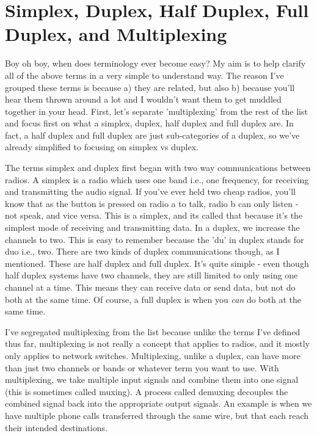 \documentclass{article}
\begin{document}
\section{Simplex, Duplex, Half Duplex, Full Duplex, and Multiplexing}

Boy oh boy, when does terminology ever become easy? My aim is to help clarify all of the above terms in a
very simple to understand way. The reason I've grouped these terms is because a) they are related, but also
b) because you'll hear them thrown around a lot and I wouldn't want them to get muddled together in your head.
First, let's separate 'multiplexing' from the rest of the list and focus first on what a simplex, duplex, half
duplex and full duplex are. In fact, a half duplex and full duplex are just sub-categories of a duplex, so
we've already simplified to focusing on simplex vs duplex.

The terms simplex and duplex first began with two way communications between radios. A simplex is a radio
which uses one band i.e., one frequency, for receiving and transmitting the audio signal. If you've ever held
two cheap radios, you'll know that as the button is pressed on radio a to talk, radio b can only listen - not
speak, and vice versa. This is a simplex, and its called that because it's the simplest mode of receiving and
transmitting data. In a duplex, we increase the channels to two. This is easy to remember because the 'du' in
duplex stands for duo i.e., two. There are two kinds of duplex communications though, as I mentioned. These are
half duplex and full duplex. It's quite simple - even though half duplex systems have two channels, they are
still limited to only using one channel at a time. This means they can receive data or send data, but not do
both at the same time. Of course, a full duplex is when you \textit{can} do both at the same time.

I've segregated multiplexing from the list because unlike the terms I've defined thus far, multiplexing is not
really a concept that applies to radios, and it mostly only applies to network switches. Multiplexing, unlike
a duplex, can have more than just two channels or bands or whatever term you want to use. With multiplexing,
we take multiple input signals and combine them into one signal (this is sometimes called muxing). A process
called demuxing decouples the combined signal back into the appropriate output signals. An example is when we
have multiple phone calls transferred through the same wire, but that each reach their intended destinations.
\end{document}

